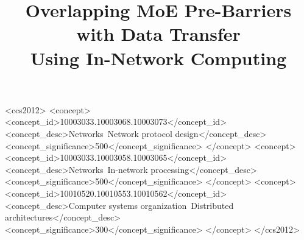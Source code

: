 \documentclass[sigplan,twocolumn,balance=false]{acmart}
\begin{document}
\title{Overlapping MoE Pre-Barriers with Data Transfer\\Using In-Network Computing}

\author{}
\affiliation{\institution{}\country{}}

\begin{abstract}

\end{abstract}

\begin{CCSXML}
<ccs2012>
<concept>
<concept_id>10003033.10003068.10003073</concept_id>
<concept_desc>Networks~Network protocol design</concept_desc>
<concept_significance>500</concept_significance>
</concept>
<concept>
<concept_id>10003033.10003058.10003065</concept_id>
<concept_desc>Networks~In-network processing</concept_desc>
<concept_significance>500</concept_significance>
</concept>
<concept>
<concept_id>10010520.10010553.10010562</concept_id>
<concept_desc>Computer systems organization~Distributed architectures</concept_desc>
<concept_significance>300</concept_significance>
</concept>
</ccs2012>
\end{CCSXML}


\maketitle
\pagestyle{plain}








\label{end:body}



\end{document}

